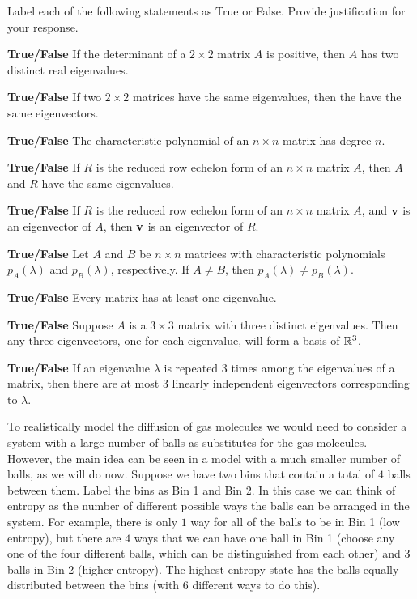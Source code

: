 \item Label each of the following statements as True or False. Provide justification for your response.
\ba

\item \textbf{True/False} If the determinant of a $2 \times 2$ matrix $A$ is positive, then $A$ has two distinct real eigenvalues.

\item \textbf{True/False} If two $2 \times 2$ matrices have the same eigenvalues, then the have the same eigenvectors. 

\item \textbf{True/False} The characteristic polynomial of an $n \times n$ matrix has degree $n$.

\item \textbf{True/False} If $R$ is the reduced row echelon form of an $n \times n$ matrix $A$, then $A$ and $R$ have the same eigenvalues. 

\item \textbf{True/False} If $R$ is the reduced row echelon form of an $n \times n$ matrix $A$, and $\mathbf{v}$ is an eigenvector of $A$, then $\mathbf{v}$ is an eigenvector of $R$. 

\item \textbf{True/False} Let $A$ and $B$ be $n \times n$ matrices with characteristic polynomials $p_A(\lambda)$ and $p_B(\lambda)$, respectively. If $A \neq B$, then $p_A(\lambda) \neq p_B(\lambda)$. 

\item \textbf{True/False}  Every matrix has at least one eigenvalue. 

\item \textbf{True/False}  Suppose $A$ is a $3 \times 3$ matrix with three distinct eigenvalues. Then any three eigenvectors, one for each eigenvalue, will form a basis of $\mathbb{R}^3$.

\item \textbf{True/False} If an eigenvalue $\lambda$ is repeated 3 times among the eigenvalues of a matrix, then there are at most 3 linearly independent eigenvectors corresponding to $\lambda$.


\ea

\ee


To realistically model the diffusion of gas molecules we would need to consider a system with a large number of balls as substitutes for the gas molecules. However, the main idea can be seen in a model with a much smaller number of balls, as we will do now. Suppose we have two bins that contain a total of $4$ balls between them. Label the bins as Bin 1 and Bin 2. In this case we can think of entropy as the number of different possible ways the balls can be arranged in the system. For example, there is only $1$ way for all of the balls to be in Bin 1 (low entropy), but there are $4$ ways that we can have one ball in Bin 1 (choose any one of the four different balls, which can be distinguished from each other) and $3$ balls in Bin 2 (higher entropy). The highest entropy state has the balls equally distributed between the bins (with $6$ different ways to do this).

